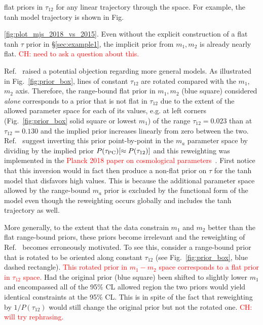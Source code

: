 \documentclass[prd,twocolumn,amsmath,amssymb,floatfix,superscriptaddress,nofootinbib]{revtex4-1}
\newcommand{\ch}[1]{\textcolor{red}{#1}}
\begin{document}
flat priors in $\tau_{12}$ for any linear trajectory through the space.   For example, the tanh model trajectory is shown in Fig.~{\ref{fig:plot_mjs_2018_vs_2015}.   Even without the explicit 
construction of a flat tanh $\tau$ prior in \S \ref{sec:example1}, 
the implicit prior from $m_1,m_2$ is already nearly flat. \ch{CH: need to ask a question about this.}

Ref.~\cite{Millea:2018bko} raised a potential objection regarding more general models.  As illustrated in Fig.~\ref{fig:prior_box}, lines of constant $\tau_{12}$ are rotated compared with the $m_1$,
$m_2$ axis.  Therefore, the range-bound flat prior in $m_1,m_2$ (blue square) considered {\it alone} corresponds to a prior that is not flat in $\tau_{12}$ due to the extent  of the allowed parameter space
for each of its values, e.g. at  left corners (Fig.~\ref{fig:prior_box} solid square or lowest $m_1$) of the range $\tau_{12}=0.023$
than at $\tau_{12} = 0.130$ and the implied prior increases linearly from zero between the two.
   Ref.~\cite{Millea:2018bko} suggest 
inverting this prior point-by-point in the $m_a$ parameter space by dividing by the implied prior $P(\tau_{\rm PC}) [ \approx P(\tau_{12})]$ and this reweighting was implemented in the \ch{Planck 2018 paper on cosmological parameters~\cite{Aghanim:2018eyx}}.
First notice that this inversion would in fact then produce a non-flat prior on $\tau$ for the tanh model
that disfavors high values.   This is because
the additional parameter space allowed by the range-bound $m_a$ prior is excluded by the functional form of the model even though the reweighting occurs globally and includes the tanh trajectory as well. 

More generally, to the extent that the data constrain $m_1$ and $m_2$ better than the flat range-bound priors, these priors become irrelevant and the reweighting of Ref.~\cite{Millea:2018bko} becomes erroneously motivated.   To see this, consider a range-bound prior that is rotated to be oriented along constant $\tau_{12}$ (see Fig.~\ref{fig:prior_box}, blue dashed rectangle). \ch{This rotated prior in $m_1-m_2$ space corresponds to a flat prior in $\tau_{12}$ space.}
Had the original prior (blue square) been shifted to slightly lower
$m_1$ and encompassed all of the 95\% CL allowed
region the two priors would yield  identical constraints at the
95\% CL.   This is in spite of the fact that reweighting by $1/P(\tau_{12})$ would still change the original prior but not the
rotated one.  \ch{CH: will try rephrasing.}

}
\end{document}
